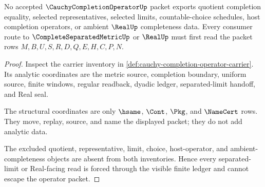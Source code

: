 \begin{theorem}
\label{thm:cauchy-completion-operator-ledger-nonescape}
No accepted $\CauchyCompletionOperatorUp$ packet exports quotient completion equality, selected representatives, selected limits, countable-choice schedules, host completion operators, or ambient $\RealUp$ completeness data. Every consumer route to $\CompleteSeparatedMetricUp$ or $\RealUp$ must first read the packet rows $M,B,U,S,R,D,Q,E,H,C,P,N$.
\end{theorem}
\begin{proof}
Inspect the carrier inventory in \autoref{def:cauchy-completion-operator-carrier}. Its analytic coordinates are the metric source, completion boundary, uniform source, finite windows, regular readback, dyadic ledger, separated-limit handoff, and Real seal.

The structural coordinates are only $\hsame$, $\Cont$, $\Pkg$, and $\NameCert$ rows. They move, replay, source, and name the displayed packet; they do not add analytic data.

The excluded quotient, representative, limit, choice, host-operator, and ambient-completeness objects are absent from both inventories. Hence every separated-limit or Real-facing read is forced through the visible finite ledger and cannot escape the operator packet.
\end{proof}


